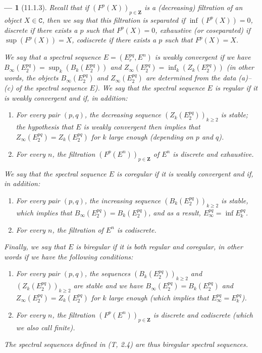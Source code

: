 \documentclass[oneside]{amsart}
\theoremstyle{ega-env-style}
\newtheorem*{env}{---}
\theoremstyle{ega-thm-env-style}
\theoremstyle{ega-defn-env-style}
\def\bb{\mathbf}                    %
\def\cat{\mathtt}                   %
\def\geq{\geqslant}                 %
\newcommand{\oldpage}[2][]{{\marginnote{\normalfont{\textbf{#1}~|~#2}}}\ignorespaces}
\let\EGAOriginalLabel\label
\renewcommand{\label}[1]{\phantomsection\EGAOriginalLabel{#1}}
\begin{document}
\begin{env}[11.1.3]
\label{0.11.1.3}
\oldpage[0\textsubscript{III}]{25}
Recall that if $(F^p(X))_{p\in\bb{Z}}$ is a (decreasing) \emph{filtration} of an object $X\in\cat{C}$, then we say that this filtration is \emph{separated} if $\inf(F^p(X))=0$, \emph{discrete} if there exists a $p$ such that $F^p(X)=0$, \emph{exhaustive} (or \emph{coseparated}) if $\sup(F^p(X))=X$, \emph{codiscrete} if there exists a $p$ such that $F^p(X)=X$.

We say that a spectral sequence $E=(E_r^{pq},E^n)$ is \emph{weakly convergent} if we have $B_\infty(E_2^{pq})=\sup_k(B_k(E_2^{pq}))$ and $Z_\infty(E_2^{pq})=\inf_k(Z_k(E_2^{pq}))$ (in other words, the objects $B_\infty(E_2^{pq})$ and $Z_\infty(E_2^{pq})$ are determined from the data (a)--(c) of the spectral sequence $E$).
We say that the spectral sequence $E$ is \emph{regular} if it is weakly convergent and if, in addition:
\begin{enumerate}
  \item[(1st)] For every pair $(p,q)$, the decreasing sequence $(Z_k(E_2^{pq}))_{k\geq 2}$ is \emph{stable}; the hypothesis that $E$ is weakly convergent then implies that $Z_\infty(E_2^{pq})=Z_k(E_2^{pq})$ for $k$ large enough (depending on $p$ and $q$).
  \item[(2nd)] For every $n$, the filtration $(F^p(E^n))_{p\in\bb{Z}}$ of $E^n$ is \emph{discrete} and \emph{exhaustive}.
\end{enumerate}

We say that the spectral sequence $E$ is \emph{coregular} if it is weakly convergent and if, in addition:
\begin{enumerate}
  \item[(3rd)] For every pair $(p,q)$, the increasing sequence $(B_k(E_2^{pq}))_{k\geq 2}$ is \emph{stable}, which implies that $B_\infty(E_2^{pq})=B_k(E_2^{pq})$, and as a result, $E_\infty^{pq}=\inf E_k^{pq}$.
  \item[(4th)] For every $n$, the filtration of $E^n$ is \emph{codiscrete}.
\end{enumerate}

Finally, we say that $E$ is \emph{biregular} if it is both regular and coregular, in other words if we have the following conditions:
\begin{enumerate}
  \item[(a)] For every pair $(p,q)$, the sequences $(B_k(E_2^{pq}))_{k\geq 2}$ and $(Z_k(E_2^{pq}))_{k\geq 2}$ are \emph{stable} and we have $B_\infty(E_2^{pq})=B_k(E_2^{pq})$ and $Z_\infty(E_2^{pq})=Z_k(E_2^{pq})$ for $k$ large enough (which implies that $E_\infty^{pq}=E_k^{pq}$).
  \item[(b)] For every $n$, the filtration $(F^p(E^n))_{p\in\bb{Z}}$ is \emph{discrete} and \emph{codiscrete} (which we also call \emph{finite}).
\end{enumerate}

The spectral sequences defined in (T, 2.4) are thus biregular spectral sequences.
\end{env}
\end{document}
